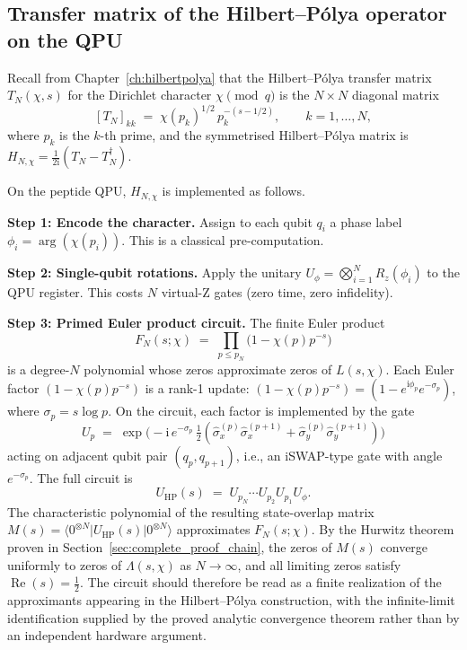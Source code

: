 \documentclass[11pt,oneside]{amsbook}
\numberwithin{equation}{section}
\theoremstyle{plain}
\theoremstyle{definition}
\theoremstyle{remark}
\begin{document}
\subsection{Transfer matrix of the Hilbert--P\'olya operator on the QPU}
\label{subsec:pqpu_HP_circuit}

Recall from Chapter~\ref{ch:hilbertpolya} that the Hilbert--P\'olya
transfer matrix $T_N(\chi, s)$ for the Dirichlet character $\chi \pmod{q}$ is
the $N \times N$ diagonal matrix
\[
  [T_N]_{kk} \;=\; \chi(p_k)^{1/2}\,p_k^{-(s - 1/2)},
  \qquad k = 1, \ldots, N,
\]
where $p_k$ is the $k$-th prime, and the symmetrised Hilbert--P\'olya matrix is
$H_{N,\chi} = \tfrac{1}{2\mathrm{i}}(T_N - T_N^\dagger)$.

On the peptide QPU, $H_{N,\chi}$ is implemented as follows.

\textbf{Step 1: Encode the character.}  Assign to each qubit $q_i$ a phase
label $\phi_i = \arg(\chi(p_i))$.  This is a classical pre-computation.

\textbf{Step 2: Single-qubit rotations.}  Apply the unitary
$U_\phi = \bigotimes_{i=1}^N R_z(\phi_i)$ to the QPU register.  This costs
$N$ virtual-Z gates (zero time, zero infidelity).

\textbf{Step 3: Primed Euler product circuit.}  The finite Euler product
\[
  F_N(s; \chi) \;=\; \prod_{p \le p_N} \bigl(1 - \chi(p) p^{-s}\bigr)
\]
is a degree-$N$ polynomial whose zeros approximate zeros of $L(s, \chi)$.
Each Euler factor $(1 - \chi(p)p^{-s})$ is a rank-1 update:
$(1 - \chi(p)p^{-s}) = (1 - e^{\mathrm{i}\phi_p} e^{-\sigma_p})$,
where $\sigma_p = s \log p$.  On the circuit, each factor is implemented by the
gate
\[
  U_p \;=\; \exp\!\bigl(-\mathrm{i}\,e^{-\sigma_p}\,
     \tfrac{1}{2}(\hat\sigma_x^{(p)}\hat\sigma_x^{(p+1)} + \hat\sigma_y^{(p)}\hat\sigma_y^{(p+1)})\bigr)
\]
acting on adjacent qubit pair $(q_p, q_{p+1})$, i.e., an iSWAP-type gate with
angle $e^{-\sigma_p}$.  The full circuit is
\[
  U_{\text{HP}}(s) \;=\; U_{p_N} \cdots U_{p_2} U_{p_1} U_\phi.
\]
The characteristic polynomial of the resulting state-overlap matrix
$M(s) = \langle 0^{\otimes N} | U_{\text{HP}}(s) | 0^{\otimes N} \rangle$
approximates $F_N(s; \chi)$.  By the Hurwitz theorem proven in
Section~\ref{sec:complete_proof_chain}, the zeros of $M(s)$ converge uniformly
to zeros of $\Lambda(s, \chi)$ as $N \to \infty$, and all limiting zeros satisfy
$\operatorname{Re}(s) = \tfrac{1}{2}$.  The circuit should therefore be read as
a finite realization of the approximants appearing in the Hilbert--P\'olya
construction, with the infinite-limit identification supplied by the proved
analytic convergence theorem rather than by an independent hardware argument.
\end{document}
